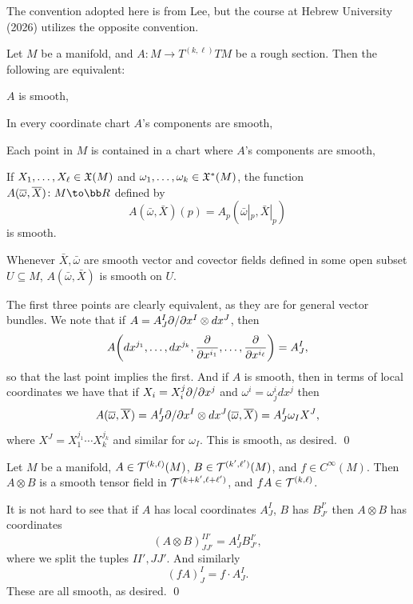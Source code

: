     The convention adopted here is from Lee, but the course at Hebrew University (2026) utilizes the opposite convention.

\enote

\bprop

    Let $M$ be a manifold, and $A\colon M\to T^{(k,\ell)}TM$ be a rough section.
    Then the following are equivalent:
    \benum
        \item $A$ is smooth,
        \item In every coordinate chart $A$'s components are smooth,
        \item Each point in $M$ is contained in a chart where $A$'s components are smooth,
        \item If $X_1,\dots,X_\ell\in{\frak X}(M)$ and $\omega_1,\dots,\omega_k\in{\frak X}^*(M)$, the function $A(\bar\omega,\bar X)\colon M\to\bR$ defined by
        $$ A(\bar\omega,\bar X)(p) = A_p(\bar\omega|_p,\bar X|_p) $$
        is smooth.
        \item Whenever $\bar X,\bar\omega$ are smooth vector and covector fields defined in some open subset $U\subseteq M$, $A(\bar\omega,\bar X)$ is smooth on $U$.
    \eenum

\eprop

\bproof
    
    The first three points are clearly equivalent, as they are for general vector bundles.
    We note that if $A=A^I_J\partial /\partial x^I\otimes dx^J$, then
    $$ A\mathopen{}\mathclose{\left(dx^{j_1},\dots,dx^{j_k},{{\partial }\over{\partial x^{i_1}}},\dots,{{\partial }\over{\partial x^{i_\ell}}}\right)} = A^I_J , $$
    so that the last point implies the first.
    And if $A$ is smooth, then in terms of local coordinates we have that if $X_i=X_i^j\partial /\partial x^j$ and $\omega^i=\omega^i_jdx^j$ then
    $$ A(\overline\omega,\overline X) = A^I_J\partial /\partial x^I\otimes dx^J(\overline\omega,\overline X) = A^I_J\omega_IX^J, $$
    where $X^J=X_1^{j_1}\cdots X_k^{j_k}$ and similar for $\omega_I$.
    This is smooth, as desired.
    \qed

\eproof

\bprop

    Let $M$ be a manifold, $A\in{{\cal T}}^{(k,\ell)}(M)$, $B\in{{\cal T}}^{(k',\ell')}(M)$, and $f\in C^\infty(M)$.
    Then $A\otimes B$ is a smooth tensor field in ${{\cal T}}^{(k+k',\ell+\ell')}$, and $fA\in{{\cal T}}^{(k,\ell)}$.

\eprop

\bproof

    It is not hard to see that if $A$ has local coordinates $A^I_J$, $B$ has $B^{I'}_{J'}$ then $A\otimes B$ has coordinates
    $$ (A\otimes B)^{II'}_{JJ'} = A^I_JB^{I'}_{J'} , $$
    where we split the tuples $II',JJ'$.
    And similarly
    $$ (fA)^I_J = f\cdot A^I_J. $$
    These are all smooth, as desired.
    \qed

